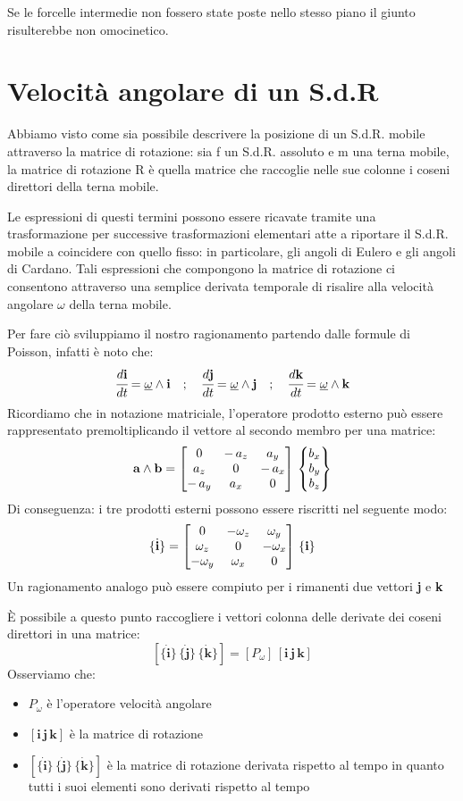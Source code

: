 Se le forcelle intermedie non fossero state poste nello stesso piano il giunto risulterebbe non omocinetico.

\section{Velocità angolare di un S.d.R}

Abbiamo visto come sia possibile descrivere la posizione di un S.d.R. mobile attraverso la matrice di rotazione: sia f un S.d.R. assoluto e m una terna mobile, la matrice di rotazione R è quella matrice che raccoglie nelle sue colonne i coseni direttori della terna mobile.

Le espressioni di questi termini possono essere ricavate tramite una trasformazione per successive trasformazioni elementari atte a riportare il S.d.R. mobile a coincidere con quello fisso: in particolare, gli angoli di Eulero e gli angoli di Cardano. Tali espressioni che compongono la matrice di rotazione ci consentono attraverso una semplice derivata temporale di risalire alla velocità angolare $\omega$ della terna mobile.

Per fare ciò sviluppiamo il nostro ragionamento partendo dalle formule di Poisson, infatti è noto che:
\[\cfrac{d\mathbf{i}}{dt} = \underline{\omega} \wedge \mathbf{i}\quad;\quad \cfrac{d\mathbf{j}}{dt} = \underline{\omega}\wedge\mathbf{j}\quad;\quad\cfrac{d\mathbf{k}}{dt} = \underline{\omega}\wedge\mathbf{k}\]
Ricordiamo che in notazione matriciale, l'operatore prodotto esterno può essere rappresentato premoltiplicando il vettore al secondo membro per una matrice:
\[\mathbf{a}\wedge\mathbf{b} = \begin{bmatrix}0&-\,a_z&a_y\\a_z&0&-\,a_x\\-\,a_y&a_x&0\end{bmatrix}\,\begin{Bmatrix}b_x\\b_y\\b_z\end{Bmatrix}\]
Di conseguenza: i tre prodotti esterni possono essere riscritti nel seguente modo:
\[\{\dot{\mathbf{i}}\} = \begin{bmatrix}0&-\omega_z&\omega_y\\\omega_z&0&-\omega_x\\-\omega_y&\omega_x&0\end{bmatrix}\,\{\mathbf{i}\}\]
Un ragionamento analogo può essere compiuto per i rimanenti due vettori \textbf{j} e \textbf{k}

È possibile a questo punto raccogliere i vettori colonna delle derivate dei coseni direttori in una matrice:
\[[\{\dot{\mathbf{i}}\}\,\{\dot{\mathbf{j}}\}\,\{\dot{\mathbf{k}}\}] = [P_{\omega}]\,[\mathbf{i}\,\mathbf{j}\,\mathbf{k}]\]
Osserviamo che:
\begin{itemize}
\item $P_{\omega}$ è l'operatore velocità angolare
\item $[\mathbf{i}\,\mathbf{j}\,\mathbf{k}]$ è la matrice di rotazione
\item $[\{\dot{\mathbf{i}}\}\,\{\dot{\mathbf{j}}\}\,\{\dot{\mathbf{k}}\}]$ è la matrice di rotazione derivata rispetto al tempo in quanto tutti i suoi elementi sono derivati rispetto al tempo
\end{itemize}

